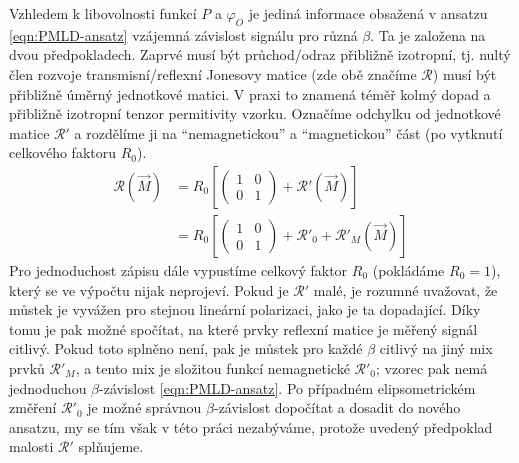 Vzhledem k libovolnosti funkcí $P$ a $\varphi_O$ je jediná informace obsažená v ansatzu \eqref{eqn:PMLD-ansatz} vzájemná závislost signálu pro různá $\beta$.
Ta je založena na dvou předpokladech.
Zaprvé musí být průchod/odraz přibližně izotropní, tj. nultý člen rozvoje transmisní/reflexní Jonesovy matice (zde obě značíme $\mathcal{R}$) musí být přibližně úměrný jednotkové matici.
V praxi to znamená téměř kolmý dopad a přibližně izotropní tenzor permitivity vzorku.
Označíme odchylku od jednotkové matice $\mathcal{R}'$ a rozdělíme ji na ``nemagnetickou'' a ``magnetickou'' část (po vytknutí celkového faktoru $R_0$).
\begin{align}
\label{eqn:PMLD-Jones}
\mathcal{R}(\vec{M}) &= R_0 \left[ \begin{pmatrix} 1&0\\0&1 \end{pmatrix} + \mathcal{R}'(\vec{M}) \right] \\
                     &= R_0 \left[ \begin{pmatrix} 1&0\\0&1 \end{pmatrix} + \mathcal{R}'_0 + \mathcal{R}'_M(\vec{M}) \right]
\end{align}
Pro jednoduchost zápisu dále vypustíme celkový faktor $R_0$ (pokládáme $R_0=1$), který se ve výpočtu nijak neprojeví.
Pokud je $\mathcal{R}'$ malé, je rozumné uvažovat, že můstek je vyvážen pro stejnou lineární polarizaci, jako je ta dopadající.
Díky tomu je pak možné spočítat, na které prvky reflexní matice je měřený signál citlivý.
Pokud toto splněno není, pak je můstek pro každé $\beta$ citlivý na jiný mix prvků $\mathcal{R}'_M$, a tento mix je složitou funkcí nemagnetické $\mathcal{R}'_0$; vzorec pak nemá jednoduchou $\beta$-závislost \eqref{eqn:PMLD-ansatz}.
Po případném elipsometrickém změření $\mathcal{R}'_0$ je možné správnou $\beta$-závislost dopočítat a dosadit do nového ansatzu, my se tím však v této práci nezabýváme, protože uvedený předpoklad malosti $\mathcal{R}'$ splňujeme.

